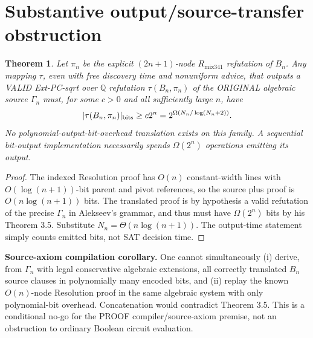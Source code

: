 \documentclass[11pt]{article}
\newtheorem{theorem}{Theorem}
\begin{document}
\section*{Substantive output/source-transfer obstruction}
\begin{theorem}
Let $\pi_n$ be the explicit $(2n+1)$-node $R_{\mathrm{mix341}}$ refutation of $B_n$. Any mapping $\tau$, even with free discovery time and nonuniform advice, that outputs a VALID Ext-PC-sqrt over $\mathbb Q$ refutation $\tau(B_n,\pi_n)$ of the ORIGINAL algebraic source $\Gamma_n$ must, for some $c>0$ and all sufficiently large $n$, have
\[
|\tau(B_n,\pi_n)|_{\rm bits}\ge c2^n=
2^{\Omega(N_n/\log(N_n+2))}.
\]
No polynomial-output-bit-overhead translation exists on this family. A sequential bit-output implementation necessarily spends $\Omega(2^n)$ operations emitting its output.
\end{theorem}
\begin{proof}
The indexed Resolution proof has $O(n)$ constant-width lines with $O(\log(n+1))$-bit parent and pivot references, so the source plus proof is $O(n\log(n+1))$ bits. The translated proof is by hypothesis a valid refutation of the precise $\Gamma_n$ in Alekseev's grammar, and thus must have $\Omega(2^n)$ bits by his Theorem 3.5. Substitute $N_n=\Theta(n\log(n+1))$. The output-time statement simply counts emitted bits, not SAT decision time.
\end{proof}
\noindent\textbf{Source-axiom compilation corollary.} One cannot simultaneously (i) derive, from $\Gamma_n$ with legal conservative algebraic extensions, all correctly translated $B_n$ source clauses in polynomially many encoded bits, and (ii) replay the known $O(n)$-node Resolution proof in the same algebraic system with only polynomial-bit overhead. Concatenation would contradict Theorem 3.5. This is a conditional no-go for the PROOF compiler/source-axiom premise, not an obstruction to ordinary Boolean circuit evaluation.
\end{document}
